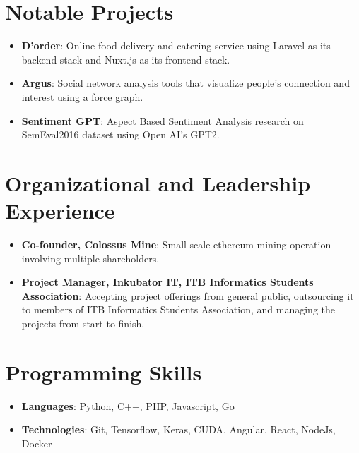 \documentclass[letterpaper,11pt]{article}
\newcommand{\resumeItem}[2]{
  \item\small{
    \textbf{#1}{: #2 \vspace{-2pt}}
  }
}
\newcommand{\resumeSubItem}[2]{\resumeItem{#1}{#2}\vspace{-4pt}}
\newcommand{\resumeSubHeadingListStart}{\begin{itemize}[leftmargin=*]}
\newcommand{\resumeSubHeadingListEnd}{\end{itemize}}
\begin{document}
\section{Notable Projects}
  \resumeSubHeadingListStart
    \resumeSubItem{D’order}
      {Online food delivery and catering service using Laravel as its backend stack and Nuxt.js as its frontend stack.}
    \resumeSubItem{Argus}
      {Social network analysis tools that visualize people’s connection and interest using a force graph.}
    \resumeSubItem{Sentiment GPT}
      {Aspect Based Sentiment Analysis research on SemEval2016 dataset using Open AI's GPT2.}
  \resumeSubHeadingListEnd 



\section{Organizational and Leadership Experience}
  \resumeSubHeadingListStart
    \resumeSubItem{Co-founder, Colossus Mine}
      {Small scale ethereum mining operation involving multiple shareholders.}
    \resumeSubItem{Project Manager, Inkubator IT, ITB Informatics Students Association}
      {Accepting project offerings from general public, outsourcing it to members of ITB Informatics Students Association, and managing the projects from start to finish.}
  \resumeSubHeadingListEnd 
  



\section{Programming Skills}
 \resumeSubHeadingListStart
   \item{
      \textbf{Languages}{: Python, C++, PHP, Javascript, Go}      
   }
   \item{
      \textbf{Technologies}{: Git, Tensorflow, Keras, CUDA, Angular, React, NodeJs, Docker}
   }
 \resumeSubHeadingListEnd


\end{document}
